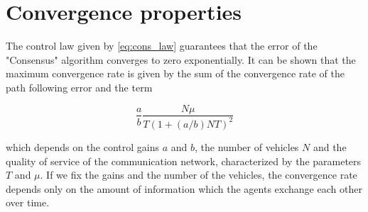 \section{Convergence properties\label{sec:convergence_properties}}

The control law given by \eqref{eq:cons_law} guarantees that the error of the
"Consensus" algorithm converges to zero exponentially.
It can be shown that the maximum convergence rate is given by the sum of
the convergence rate of the path following error and the term

\begin{equation}
  \frac{a}{b} \frac{N \mu}{T ( 1 + (a / b) N T)^2}
\end{equation}

which depends on the control gains $a$ and $b$, the number of vehicles $N$ and
the quality of service of the communication network, characterized by the parameters
$T$ and $\mu$.
If we fix the gains and the number of the vehicles, the convergence rate depends
only on the amount of information which the agents exchange each other over time.
